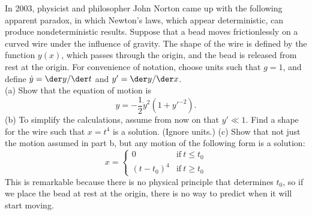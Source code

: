 In 2003, physicist and philosopher John Norton came up with the following
apparent paradox, in which Newton's laws, which appear deterministic,
can produce nondeterministic results.
Suppose that a bead moves frictionlessly on a curved wire under the
influence of gravity. The shape of the wire is defined by the function
$y(x)$, which passes through the origin, and the bead is released from rest at the
origin. For convenience of notation, choose units such that $g=1$, and
define $\dot{y}=\der y/\der t$ and $y'=\der y/\der x$.\\
(a) Show that the equation of motion is
\begin{equation*}
  y = -\frac{1}{2}\dot{y}^2\left(1+y'^{-2}\right).
\end{equation*}\hwendpart
(b) To simplify the calculations, assume from now on that $y'\ll 1$.
Find a shape for the wire such that $x=t^4$ is a solution.
(Ignore units.)\answercheck\hwendpart
(c) Show that not just the motion assumed in part b, but
any motion of the following form is a solution:
\begin{equation*}
  x = \begin{cases}
    0          & \text{if}\ t\le t_0 \\
    (t-t_0)^4  & \text{if}\ t\ge t_0 
  \end{cases}
\end{equation*}
This is remarkable because there is no physical principle that determines
$t_0$, so if we place the bead at rest at the origin, there is no way
to predict when it will start moving.
